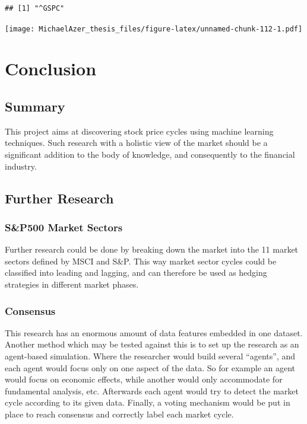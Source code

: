 \documentclass[]{book}
\begin{document}
\begin{verbatim}
## [1] "^GSPC"
\end{verbatim}

\texttt{[image: MichaelAzer\_thesis\_files/figure-latex/unnamed-chunk-112-1.pdf]}

\hypertarget{conclusion}{%
\chapter{Conclusion}\label{conclusion}}

\hypertarget{summary}{%
\section{Summary}\label{summary}}

This project aims at discovering stock price cycles using machine learning techniques. Such research with a holistic view of the market should be a significant addition to the body of knowledge, and consequently to the financial industry.

\hypertarget{further-research}{%
\section{Further Research}\label{further-research}}

\hypertarget{sp500-market-sectors}{%
\subsection{S\&P500 Market Sectors}\label{sp500-market-sectors}}

Further research could be done by breaking down the market into the 11 market sectors defined by MSCI and S\&P. This way market sector cycles could be classified into leading and lagging, and can therefore be used as hedging strategies in different market phases.

\hypertarget{consensus}{%
\subsection{Consensus}\label{consensus}}

This research has an enormous amount of data features embedded in one dataset. Another method which may be tested against this is to set up the research as an agent-based simulation. Where the researcher would build several ``agents'', and each agent would focus only on one aspect of the data. So for example an agent would focus on economic effects, while another would only accommodate for fundamental analysis, etc. Afterwards each agent would try to detect the market cycle according to its given data. Finally, a voting mechanism would be put in place to reach consensus and correctly label each market cycle.
\end{document}
